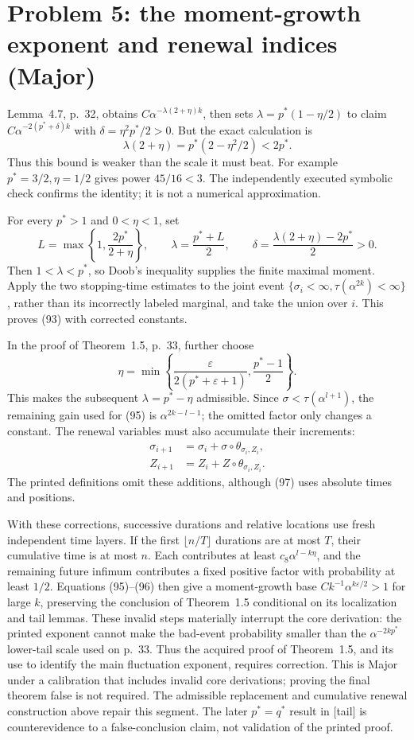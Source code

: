 \documentclass[10pt]{article}
\begin{document}
\section*{Problem 5: the moment-growth exponent and renewal indices (Major)}
Lemma 4.7, p. 32, obtains \(C\alpha^{-\lambda(2+\eta)k}\), then sets \(\lambda=p^*(1-\eta/2)\) to claim \(C\alpha^{-2(p^*+\delta)k}\) with \(\delta=\eta^2p^*/2>0\). But the exact calculation is \[\lambda(2+\eta)=p^*(2-\eta^2/2)<2p^*.\] Thus this bound is weaker than the scale it must beat. For example \(p^*=3/2,\eta=1/2\) gives power \(45/16<3\). The independently executed symbolic check confirms the identity; it is not a numerical approximation.\par
For every \(p^*>1\) and \(0<\eta<1\), set \[L=\max\left\{1,\frac{2p^*}{2+\eta}\right\},\qquad
 \lambda=\frac{p^*+L}{2},\qquad
 \delta=\frac{\lambda(2+\eta)-2p^*}{2}>0.\] Then \(1<\lambda<p^*\), so Doob’s inequality supplies the finite maximal moment. Apply the two stopping-time estimates to the joint event \(\{\sigma_i<\infty,\tau(\alpha^{2k})<\infty\}\), rather than its incorrectly labeled marginal, and take the union over \(i\). This proves (93) with corrected constants.\par
In the proof of Theorem 1.5, p. 33, further choose \[\eta=\min\left\{\frac{\varepsilon}{2(p^*+\varepsilon+1)},
                   \frac{p^*-1}{2}\right\}.\] This makes the subsequent \(\lambda=p^*-\eta\) admissible. Since \(\sigma<\tau(\alpha^{l+1})\), the remaining gain used for (95) is \(\alpha^{2k-l-1}\); the omitted factor only changes a constant. The renewal variables must also accumulate their increments: \[\begin{split}
 \sigma_{i+1}&=\sigma_i+\sigma\circ\theta_{\sigma_i,Z_i},\\
 Z_{i+1}&=Z_i+Z\circ\theta_{\sigma_i,Z_i}.
 \end{split}\] The printed definitions omit these additions, although (97) uses absolute times and positions.\par
With these corrections, successive durations and relative locations use fresh independent time layers. If the first \(\lfloor n/T\rfloor\) durations are at most \(T\), their cumulative time is at most \(n\). Each contributes at least \(c_8\alpha^{l-k\eta}\), and the remaining future infimum contributes a fixed positive factor with probability at least \(1/2\). Equations (95)–(96) then give a moment-growth base \(Ck^{-1}\alpha^{k\varepsilon/2}>1\) for large \(k\), preserving the conclusion of Theorem 1.5 conditional on its localization and tail lemmas. These invalid steps materially interrupt the core derivation: the printed exponent cannot make the bad-event probability smaller than the \(\alpha^{-2kp^*}\) lower-tail scale used on p. 33. Thus the acquired proof of Theorem 1.5, and its use to identify the main fluctuation exponent, requires correction. This is Major under a calibration that includes invalid core derivations; proving the final theorem false is not required. The admissible replacement and cumulative renewal construction above repair this segment. The later \(p^*=q^*\) result in [tail] is counterevidence to a false-conclusion claim, not validation of the printed proof.\par
\end{document}
